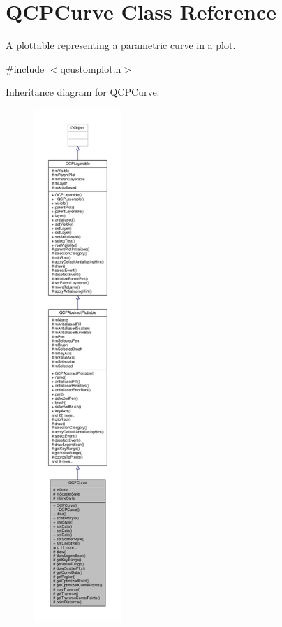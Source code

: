 \hypertarget{class_q_c_p_curve}{}\section{Q\+C\+P\+Curve Class Reference}
\label{class_q_c_p_curve}


A plottable representing a parametric curve in a plot.  




{\ttfamily \#include $<$qcustomplot.\+h$>$}



Inheritance diagram for Q\+C\+P\+Curve\+:\nopagebreak
\begin{figure}[H]
\begin{center}
\leavevmode
\includegraphics[height=550pt]{class_q_c_p_curve__inherit__graph}
\end{center}
\end{figure}


